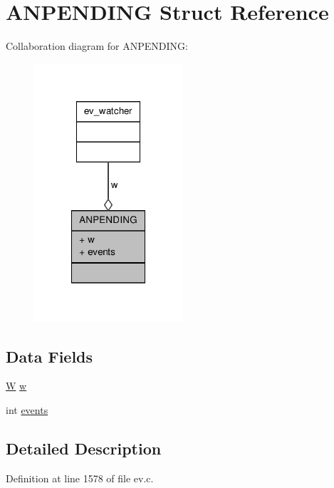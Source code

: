 \hypertarget{struct_a_n_p_e_n_d_i_n_g}{\section{\-A\-N\-P\-E\-N\-D\-I\-N\-G \-Struct \-Reference}
\label{struct_a_n_p_e_n_d_i_n_g}
}


\-Collaboration diagram for \-A\-N\-P\-E\-N\-D\-I\-N\-G\-:
\nopagebreak
\begin{figure}[H]
\begin{center}
\leavevmode
\includegraphics[width=156pt]{struct_a_n_p_e_n_d_i_n_g__coll__graph}
\end{center}
\end{figure}
\subsection*{\-Data \-Fields}
\begin{DoxyCompactItemize}
\item 
\hyperlink{ev_8c_a1d5a98f4500d54b812947ada8c7d517f}{\-W} \hyperlink{struct_a_n_p_e_n_d_i_n_g_aa2a9fd41c12285551bc8b6554950bd61}{w}
\item 
int \hyperlink{struct_a_n_p_e_n_d_i_n_g_a81a8a3a775bf2b769ce2a0f687a44c9f}{events}
\end{DoxyCompactItemize}


\subsection{\-Detailed \-Description}


\-Definition at line 1578 of file ev.\-c.



